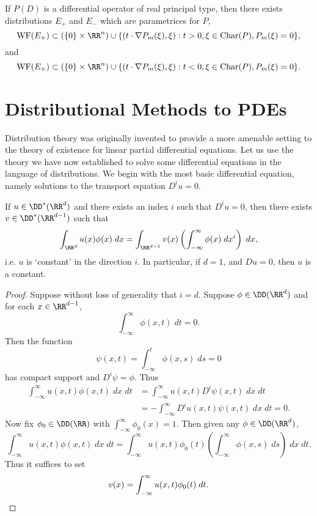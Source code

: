 \begin{lemma}
    If $P(D)$ is a differential operator of real principal type, then there exists distributions $E_+$ and $E_-$ which are parametrices for $P$,
    \[ \text{WF}(E_+) \subset (\{ 0 \} \times \RR^n) \cup \{ (t \cdot \nabla P_m(\xi), \xi) : t > 0, \xi \in \text{Char}(P), P_m(\xi) = 0 \}, \]
    and
    \[ \text{WF}(E_+) \subset (\{ 0 \} \times \RR^n) \cup \{ (t \cdot \nabla P_m(\xi), \xi) : t < 0, \xi \in \text{Char}(P), P_m(\xi) = 0 \}. \]
\end{lemma}











\chapter{Distributional Methods to PDEs}

Distribution theory was originally invented to provide a more amenable setting to the theory of existence for linear partial differential equations. Let us use the theory we have now established to solve some differential equations in the language of distributions. We begin with the most basic differential equation, namely solutions to the transport equation $D^i u = 0$.

\begin{theorem}
  If $u \in \DD^*(\RR^d)$ and there exists an index $i$ such that $D^i u = 0$, then there exists $v \in \DD^*(\RR^{d-1})$ such that
  \[ \int_{\RR^d} u(x) \phi(x)\; dx = \int_{\RR^{d-1}} v(x) \left( \int_{-\infty}^\infty \phi(x)\; dx^i \right)\; dx, \]
  i.e. $u$ is `constant' in the direction $i$. In particular, if $d = 1$, and $D u = 0$, then $u$ is a constant.
\end{theorem}
\begin{proof}
  Suppose without loss of generality that $i = d$. Suppose $\phi \in \DD(\RR^d)$ and for each $x \in \RR^{d-1}$,
  \[ \int_{-\infty}^\infty \phi(x,t)\; dt = 0. \]
  Then the function
  \[ \psi(x,t) = \int_{-\infty}^t \phi(x,s)\; ds = 0 \]
  has compact support and $D^i \psi = \phi$. Thus
  \begin{align*}
    \int_{-\infty}^\infty u(x,t) \phi(x,t)\; dx\; dt &= \int_{-\infty}^\infty u(x,t) D^i \psi(x,t)\; dx\; dt\\
    &= - \int_{-\infty}^\infty D^i u(x,t) \psi(x,t)\; dx\; dt = 0.
  \end{align*}
  Now fix $\phi_0 \in \DD(\RR)$ with $\int_{-\infty}^\infty \phi_0(x) = 1$. Then given any $\phi \in \DD(\RR^d)$,
  \[ \int_{-\infty}^\infty u(x,t) \phi(x,t)\; dx\; dt = \int_{-\infty}^\infty u(x,t) \phi_0(t) \left( \int_{-\infty}^\infty \phi(x,s)\; ds \right)\; dx\; dt. \]
  Thus it suffices to set
  \[ v(x) = \int_{-\infty}^\infty u(x,t) \phi_0(t)\; dt. \qedhere \]
\end{proof}

